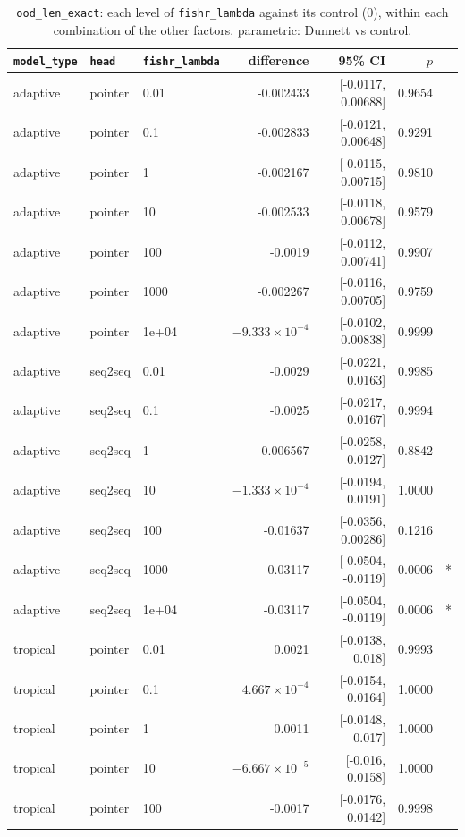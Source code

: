 \documentclass[10pt]{article}
\begin{document}
{\small
\begin{longtable}{lllrrrl}
\caption{\texttt{ood\_len\_exact}: each level of \texttt{fishr\_lambda} against its control (0), within each combination of the other factors. parametric: Dunnett vs control.}\label{tab:control-ood_len_exact}\\
\toprule
\texttt{model\_type} & \texttt{head} & \texttt{fishr\_lambda} & difference & 95\% CI & $p$ & \\
\midrule
\endhead
adaptive & pointer & 0.01 & -0.002433 & [-0.0117, 0.00688] & 0.9654 & \\
adaptive & pointer & 0.1 & -0.002833 & [-0.0121, 0.00648] & 0.9291 & \\
adaptive & pointer & 1 & -0.002167 & [-0.0115, 0.00715] & 0.9810 & \\
adaptive & pointer & 10 & -0.002533 & [-0.0118, 0.00678] & 0.9579 & \\
adaptive & pointer & 100 & -0.0019 & [-0.0112, 0.00741] & 0.9907 & \\
adaptive & pointer & 1000 & -0.002267 & [-0.0116, 0.00705] & 0.9759 & \\
adaptive & pointer & 1e+04 & $-9.333\times10^{-4}$ & [-0.0102, 0.00838] & 0.9999 & \\
adaptive & seq2seq & 0.01 & -0.0029 & [-0.0221, 0.0163] & 0.9985 & \\
adaptive & seq2seq & 0.1 & -0.0025 & [-0.0217, 0.0167] & 0.9994 & \\
adaptive & seq2seq & 1 & -0.006567 & [-0.0258, 0.0127] & 0.8842 & \\
adaptive & seq2seq & 10 & $-1.333\times10^{-4}$ & [-0.0194, 0.0191] & 1.0000 & \\
adaptive & seq2seq & 100 & -0.01637 & [-0.0356, 0.00286] & 0.1216 & \\
adaptive & seq2seq & 1000 & -0.03117 & [-0.0504, -0.0119] & 0.0006 & *\\
adaptive & seq2seq & 1e+04 & -0.03117 & [-0.0504, -0.0119] & 0.0006 & *\\
tropical & pointer & 0.01 & 0.0021 & [-0.0138, 0.018] & 0.9993 & \\
tropical & pointer & 0.1 & $4.667\times10^{-4}$ & [-0.0154, 0.0164] & 1.0000 & \\
tropical & pointer & 1 & 0.0011 & [-0.0148, 0.017] & 1.0000 & \\
tropical & pointer & 10 & $-6.667\times10^{-5}$ & [-0.016, 0.0158] & 1.0000 & \\
tropical & pointer & 100 & -0.0017 & [-0.0176, 0.0142] & 0.9998 & \\

\end{longtable}}
\end{document}
